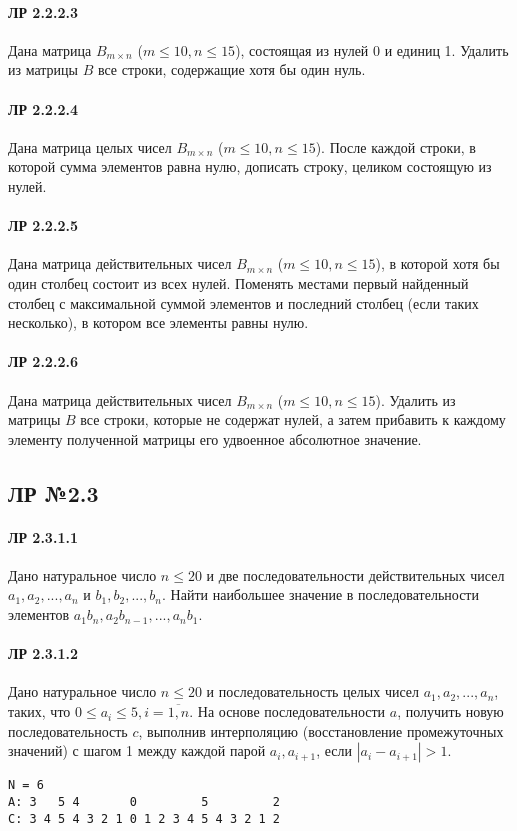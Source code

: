 \documentclass[12pt,a4paper]{report}
\begin{document}
\paragraph*{ЛР 2.2.2.3} Дана матрица $B_{m \times n}$ ($m \le 10, n \le 15$), состоящая из нулей 0 и единиц 1. Удалить из матрицы $B$ все строки, содержащие хотя бы один нуль.
\paragraph*{ЛР 2.2.2.4} Дана матрица целых чисел $B_{m \times n}$ ($m \le 10, n \le 15$). После каждой строки, в которой сумма элементов равна нулю, дописать строку, целиком состоящую из нулей.
\paragraph*{ЛР 2.2.2.5} Дана матрица действительных чисел $B_{m \times n}$ ($m \le 10, n \le 15$), в которой хотя бы один столбец состоит из всех нулей. Поменять местами первый найденный столбец с максимальной суммой элементов и последний столбец (если таких несколько), в котором все элементы равны нулю.
\paragraph*{ЛР 2.2.2.6} Дана матрица действительных чисел $B_{m \times n}$ ($m \le 10, n \le 15$). Удалить из матрицы $B$ все строки, которые не содержат нулей, а затем прибавить к каждому элементу полученной матрицы его удвоенное абсолютное значение.


\clearpage
\subsection*{ЛР №2.3}
\paragraph*{ЛР 2.3.1.1} Дано натуральное число $n \le 20$ и две последовательности действительных чисел $a_1, a_2, ..., a_n$ и $b_1, b_2, ..., b_n$. Найти наибольшее значение в последовательности элементов $a_1 b_n, a_2 b_{n-1}, ..., a_n b_1$.
\paragraph*{ЛР 2.3.1.2} Дано натуральное число $n \le 20$ и последовательность целых чисел $a_1, a_2, ..., a_n$, таких, что $0 \le a_i  \le 5, i = \overline{1,n}$. На основе последовательности $a$, получить новую последовательность $c$, выполнив интерполяцию (восстановление промежуточных значений) с шагом 1 между каждой парой $a_i, a_{i+1}$, если $|a_i - a_{i+1}| > 1$.
\begin{verbatim}
N = 6
A: 3   5 4       0         5         2
C: 3 4 5 4 3 2 1 0 1 2 3 4 5 4 3 2 1 2
\end{verbatim}
\end{document}

